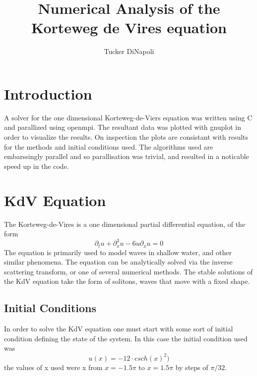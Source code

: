 \documentclass{article}
\author{Tucker DiNapoli}
\title{Numerical Analysis of the Korteweg de Vires equation}
\begin{document}
\maketitle
\section{Introduction}
A solver for the one dimensional Korteweg-de-Viers equation was written using C
and parallized using openmpi. The resultant data was plotted with gnuplot in
order to visualize the results. On inspection the plots are consistant with
results for the methods and initial conditions used. The algorithms used are
embarssingly parallel and so parallisation was trivial, and resulted in a
noticable speed up in the code.
\section{KdV Equation}
The Korteweg-de-Vires is a one dimensional partial differential
equation, of the form \[\partial_tu+\partial_x^3u-6u\partial_xu=0\]
The equation is primarily used to model waves in shallow water, and other
similar phenomena. The equation can be analytically solved via the
inverse scattering transform, or one of several numerical methods. The
stable solutions of the KdV equation take the form of solitons, waves
that move with a fixed shape.
\subsection{Initial Conditions}
In order to solve the KdV equation one must start with some sort of
initial condition defining the state of the system. In this case the
initial condition used was \[u(x)=-12\cdot csch(x)^2)\] the values of
x used were x from \(x=-1.5\pi\) to \(x=1.5\pi\) by steps of
\(\pi/32\).
\end{document}
